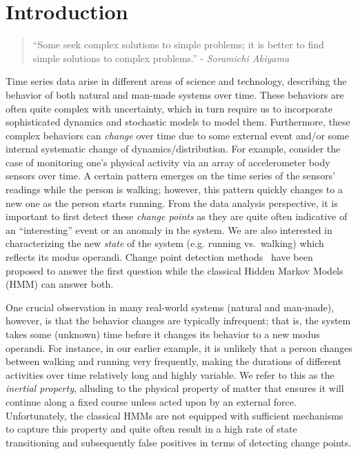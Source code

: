 \documentclass[letterpaper]{article}
\newenvironment{dedication}
        {\vspace{0.0ex}\begin{quotation}\begin{center}\begin{em}}
        {\par\end{em}\end{center}\end{quotation}}
\begin{document}
\section{Introduction}
\vspace{-0.1cm}
\begin{dedication} ``Some seek complex solutions to simple problems; it is better to find simple solutions to complex problems.'' - \emph{Soramichi Akiyama}
\end{dedication}
\vspace{-0.1cm}
Time series data arise in different areas of science and technology, describing
the behavior of both natural and man-made systems over time. These
behaviors are often quite complex with uncertainty, which in turn require us to
incorporate sophisticated dynamics and stochastic models to model them.
Furthermore, these complex behaviors can \emph{change} over time due to some external event and/or some internal
systematic change of dynamics/distribution. For example, consider the case of
monitoring one's physical activity via an array of accelerometer body sensors
over time. A certain pattern emerges on the time series of the sensors' readings
while the person is walking; however, this pattern quickly changes to a new one
as the person starts running. From the data analysis perspective, it is
important to first detect these \emph{change points} as they are quite often
indicative of an ``interesting'' event or an anomaly in the system. We
are also interested in characterizing the new \emph{state} of the system (e.g. running vs.\
walking) which reflects its modus operandi. Change point detection methods~\cite{} have been proposed
to answer the first question while the classical Hidden Markov Models (HMM) can
answer both.

One crucial observation in many real-world systems (natural and man-made),
however, is that the behavior changes are typically infrequent; that is, the
system takes some (unknown) time before it changes its behavior to a new modus operandi. For
instance, in our earlier example, it is unlikely that a person changes between
walking and running very frequently, making the durations of different
activities over time relatively long and highly variable. We refer to this as the
\emph{inertial property}, alluding to the physical property of matter that
ensures it will continue along a fixed course unless acted upon by an external
force. Unfortunately, the classical HMMs are not equipped with sufficient
mechanisms to capture this property and quite often result in a high rate of
state transitioning and subsequently false positives in terms of detecting
change points.
\end{document}
